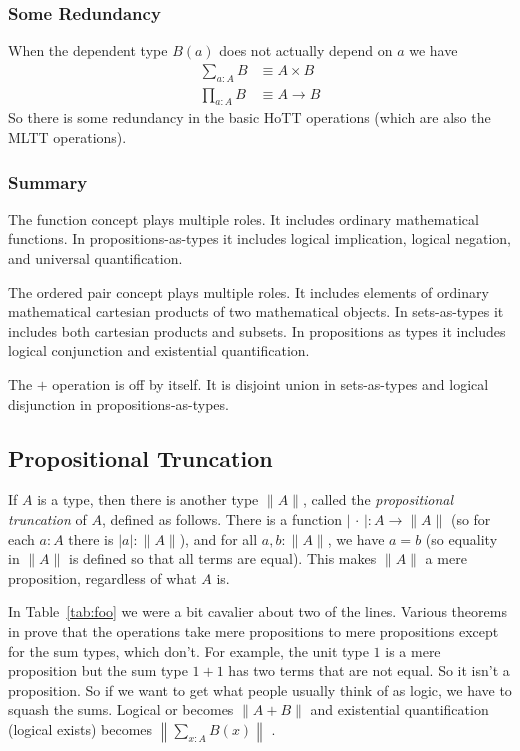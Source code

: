\documentclass[11pt]{article}
\newcommand{\proptrunc}[1]{\lVert #1 \rVert}
\newcommand{\termtrunc}[1]{\lvert #1 \rvert}
\newcommand{\bigproptrunc}[1]{\left\lVert #1 \right\rVert}
\newcommand{\fatdot}{\,\cdot\,}
\begin{document}
\subsubsection{Some Redundancy}

When the dependent type $B(a)$ does not
actually depend on $a$ we have
\begin{align*}
   \sum_{a : A} B & \equiv A \times B
   \\
   \prod_{a : A} B & \equiv A \to B
\end{align*}
So there is some redundancy in the basic HoTT operations
(which are also the MLTT operations).

\subsubsection{Summary}

The function concept plays multiple roles.
It includes ordinary mathematical functions.
In propositions-as-types it includes logical implication,
logical negation, and universal quantification.

The ordered pair concept plays multiple roles.
It includes elements of ordinary mathematical cartesian products
of two mathematical objects.  In sets-as-types it includes both
cartesian products and subsets.
In propositions as types it includes logical conjunction and
existential quantification.

The $+$ operation is off by itself.
It is disjoint union in sets-as-types
and logical disjunction in propositions-as-types.

\subsection{Propositional Truncation}
\label{sec:truncation}

If $A$ is a type, then there is another type $\proptrunc{A}$,
called the \emph{propositional truncation} of $A$, defined
as follows.  There is a function $\termtrunc{\fatdot} : A \to \proptrunc{A}$
(so for each $a : A$ there is $\termtrunc{a} : \proptrunc{A}$),
and for all $a, b : \proptrunc{A}$, we have $a = b$
(so equality in $\proptrunc{A}$ is defined so that all terms are equal).
This makes $\proptrunc{A}$ a mere proposition, regardless of what $A$ is.

In Table~\ref{tab:foo} we were a bit cavalier about two of the lines.
Various theorems in  prove that the operations take
mere propositions to mere propositions except for the sum types, which don't.
For example, the unit type $1$ is a mere proposition
but the sum type $1 + 1$ has two terms that
are not equal.  So it isn't a proposition.
So if we want to get what people usually
think of as logic, we have to squash the sums.  Logical or becomes
$\proptrunc{A + B}$ and existential quantification (logical exists) becomes
$\bigproptrunc{\sum_{x : A} B(x)}$
.
\end{document}
